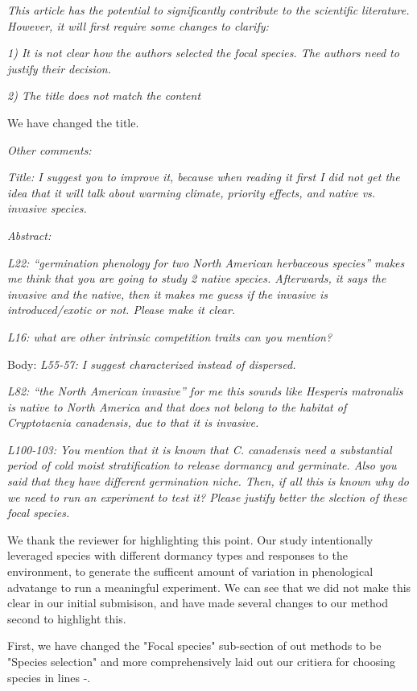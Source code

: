 \documentclass[11pt]{article}
\begin{document}
\emph{This article has the potential to significantly contribute to the scientific literature. However, it will first require some changes to clarify:}


\emph{1) It is not clear how the authors selected the focal species. The authors need to justify their decision.}

\emph{2) The title does not match the content}

We have changed the title.


\emph{Other comments:}

\emph{Title: I suggest you to improve it, because when reading it first I did not get the idea that it will talk about warming climate, priority effects, and native vs. invasive species.}


\emph{ Abstract:} 

\emph{L22: “germination phenology for two North American herbaceous species” makes me think that you are going to study 2 native species. Afterwards, it says the invasive and the native, then it makes me guess if the invasive is introduced/exotic or not. Please make it clear.}


\emph{L16: what are other intrinsic competition traits can you mention?}


Body:
\emph{L55-57: I suggest characterized instead of dispersed.}

\emph{L82: “the North American invasive” for me this sounds like Hesperis matronalis is native to North America and that does not belong to the habitat of Cryptotaenia canadensis, due to that it is invasive.}


\emph{L100-103: You mention that it is known that C. canadensis need a substantial period of cold moist stratification to release dormancy and germinate. Also you said that they have different germination niche. Then, if all this is known why do we need to run an experiment to test it? Please justify better the slection of these focal species.}

We thank the reviewer for highlighting this point. Our study intentionally leveraged species with different dormancy types and responses to the environment, to generate the sufficent amount of variation in phenological advatange to run a meaningful experiment. We can see that we did not make this clear in our initial submisison, and have made several changes to our method second to highlight this.

First, we have changed the "Focal species" sub-section of out methods to be "Species selection" and more comprehensively laid out our critiera for choosing species in lines -.
\end{document}
